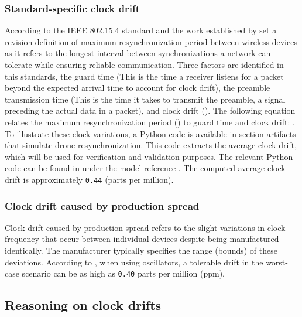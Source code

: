 \subsubsection{Standard-specific clock drift}
According to the IEEE 802.15.4 standard and the work established by \citeauthor{Elsts2018} \cite{Elsts2018} set a revision definition of maximum resynchronization period between wireless devices as it refers to the longest interval between synchronizations a network can tolerate while ensuring reliable communication. Three factors are identified in this standards, the guard time  (This is the time a receiver listens for a packet beyond the expected arrival time to account for clock drift), the preamble transmission time   (This is the time it takes to transmit the preamble, a signal preceding the actual data in a packet), and clock drift (\emath{\delta}). The following equation relates the maximum resynchronization period () to guard time and clock drift: . To illustrate these clock variations, a Python code is available in section artifacts that simulate drone resynchronization. This code extracts the average clock drift, which will be used for verification and validation purposes. The relevant Python code can be found in \cite{csi2023} under the model reference . The computed average clock drift is approximately \texttt{0.44} (parts per million). 

\subsubsection{Clock drift caused by production spread}
Clock drift caused by production spread refers to the slight variations in clock frequency that occur between individual devices despite being manufactured identically. The manufacturer typically specifies the range (bounds) of these deviations. According to \cite{Elsts2018}, when using oscillators, a tolerable drift in the worst-case scenario can be as high as \texttt{0.40} parts per million (ppm).



\subsection{Reasoning on clock drifts}

